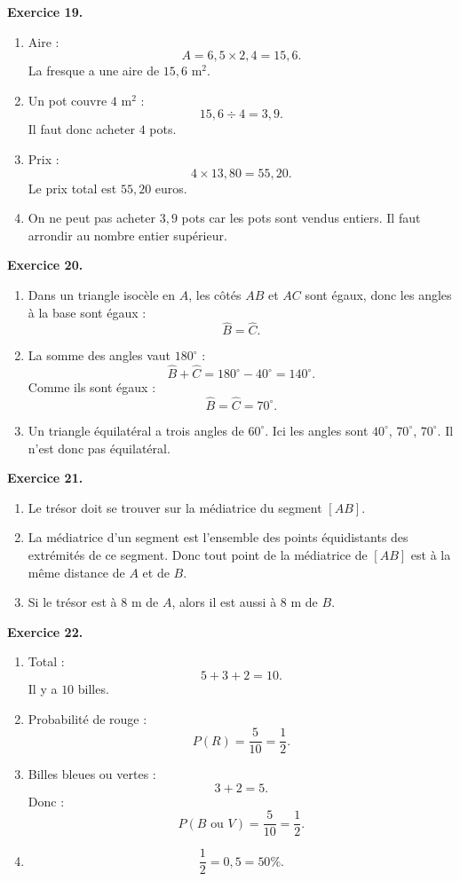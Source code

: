 \documentclass[11pt,a4paper]{article}
\newcommand{\corrige}[2]{
\begin{corrigebox}
\textbf{Exercice #1.}

#2
\end{corrigebox}
}
\begin{document}
\corrige{19}{
\begin{enumerate}[label=\arabic*)]
\item Aire :
\[
A=6,5\times 2,4=15,6.
\]
La fresque a une aire de $15,6$ m$^2$.
\item Un pot couvre $4$ m$^2$ :
\[
15,6\div 4=3,9.
\]
Il faut donc acheter $4$ pots.
\item Prix :
\[
4\times 13,80=55,20.
\]
Le prix total est $55,20$ euros.
\item On ne peut pas acheter $3,9$ pots car les pots sont vendus entiers. Il faut arrondir au nombre entier supérieur.
\end{enumerate}
}

\corrige{20}{
\begin{enumerate}[label=\arabic*)]
\item Dans un triangle isocèle en $A$, les côtés $AB$ et $AC$ sont égaux, donc les angles à la base sont égaux :
\[
\widehat{B}=\widehat{C}.
\]
\item La somme des angles vaut $180^\circ$ :
\[
\widehat{B}+\widehat{C}=180^\circ-40^\circ=140^\circ.
\]
Comme ils sont égaux :
\[
\widehat{B}=\widehat{C}=70^\circ.
\]
\item Un triangle équilatéral a trois angles de $60^\circ$.
Ici les angles sont $40^\circ$, $70^\circ$, $70^\circ$.
Il n'est donc pas équilatéral.
\end{enumerate}
}

\corrige{21}{
\begin{enumerate}[label=\arabic*)]
\item Le trésor doit se trouver sur la médiatrice du segment $[AB]$.
\item La médiatrice d'un segment est l'ensemble des points équidistants des extrémités de ce segment.
Donc tout point de la médiatrice de $[AB]$ est à la même distance de $A$ et de $B$.
\item Si le trésor est à $8$ m de $A$, alors il est aussi à $8$ m de $B$.
\end{enumerate}
}

\corrige{22}{
\begin{enumerate}[label=\arabic*)]
\item Total :
\[
5+3+2=10.
\]
Il y a $10$ billes.
\item Probabilité de rouge :
\[
P(R)=\frac{5}{10}=\frac{1}{2}.
\]
\item Billes bleues ou vertes :
\[
3+2=5.
\]
Donc :
\[
P(B\text{ ou }V)=\frac{5}{10}=\frac{1}{2}.
\]
\item
\[
\frac{1}{2}=0,5=50\%.
\]
\end{enumerate}
}
\end{document}
